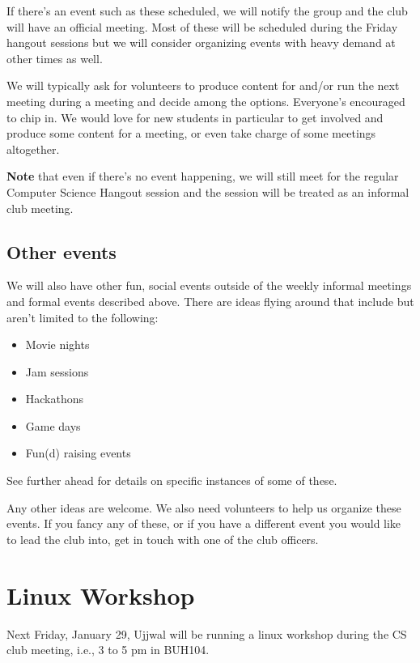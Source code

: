If there's an event such as these scheduled, we will notify the group and the
club will have an official meeting. Most of these will be scheduled during the
Friday hangout sessions but we will consider organizing events with heavy
demand at other times as well.

We will typically ask for volunteers to produce content for and/or run the next
meeting during a meeting and decide among the options. Everyone's encouraged to
chip in. We would love for new students in particular to get involved and
produce some content for a meeting, or even take charge of some meetings
altogether.

\textbf{Note} that even if there's no event happening, we will still meet for the
regular Computer Science Hangout session and the session will be treated as an
informal club meeting.

\newpage

\subsection{Other events}
\label{sec-3-4}

We will also have other fun, social events outside of the weekly informal
meetings and formal events described above. There are ideas flying around that
include but aren't limited to the following:
\begin{itemize}
\item Movie nights
\item Jam sessions
\item Hackathons
\item Game days
\item Fun(d) raising events
\end{itemize}

See further ahead for details on specific instances of some of these.

Any other ideas are welcome. We also need volunteers to help us organize these
events. If you fancy any of these, or if you have a different event you would
like to lead the club into, get in touch with one of the club officers.


\newpage


\section{Linux Workshop}
\label{sec-4}

Next Friday, January 29, Ujjwal will be running a linux workshop during the CS club
meeting, i.e., 3 to 5 pm in BUH104.

